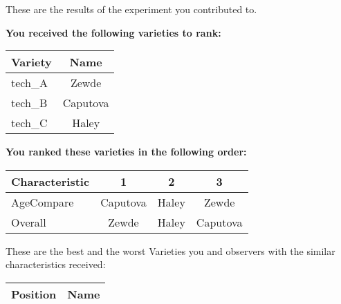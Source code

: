 \documentclass[10pt]{article}
\begin{document}
\begin{titlepage}
	These are the results of the experiment you contributed to.

	\begin{flushleft}
		\textbf{You received the following varieties to rank: }\hfill \break
		\begin{tabularx}{\textwidth}{ X | c  }
			\hline
			\textbf{Variety} & \textbf{Name} \\ \hline

			
				tech\_A & Zewde \\ \hline
			
				tech\_B & Caputova \\ \hline
			
				tech\_C & Haley \\ \hline
			


		\end{tabularx}\newline \newline

		\textbf{You ranked these varieties in the following order: }\hfill \break
		\begin{tabularx}{\textwidth}{ X | c | c | c  }
			\hline
			\textbf{Characteristic}
			
				& \textbf{ 1 }
			
				& \textbf{ 2 }
			
				& \textbf{ 3 }
			
			\\ \hline


			
				AgeCompare & Caputova  & Haley  & Zewde  \\ \hline


			
				Overall & Zewde  & Haley  & Caputova  \\ \hline


			

		\end{tabularx}

	\end{flushleft}

	\pagebreak

	\begin{flushleft}
		These are the best and the worst Varieties you and observers with the similar characteristics received:\hfill \break \newline
		\begin{tabularx}{\textwidth}{ X | X  }
			\hline
			\textbf{Position} & \textbf{Name} \\ \hline


\end{tabularx}
\end{flushleft}
\end{titlepage}
\end{document}
